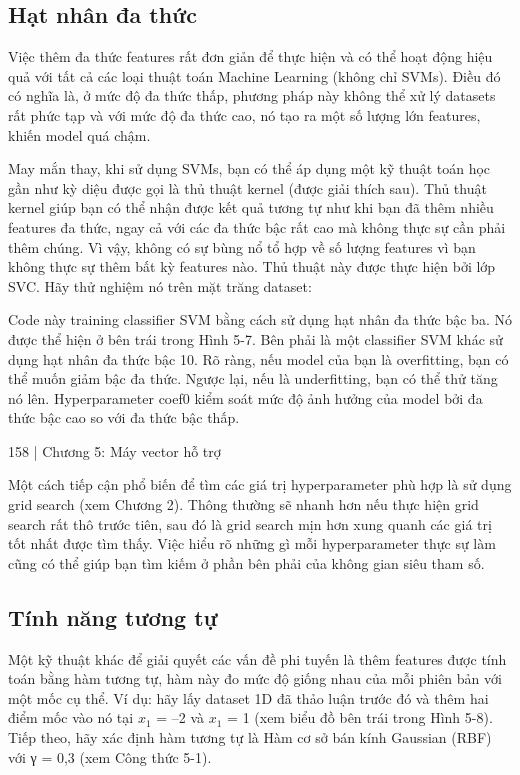 \subsection{Hạt nhân đa thức}

Việc thêm đa thức features rất đơn giản để thực hiện và có thể hoạt động hiệu quả với tất cả các loại thuật toán Machine Learning (không chỉ SVMs). Điều đó có nghĩa là, ở mức độ đa thức thấp, phương pháp này không thể xử lý datasets rất phức tạp và với mức độ đa thức cao, nó tạo ra một số lượng lớn features, khiến model quá chậm.

May mắn thay, khi sử dụng SVMs, bạn có thể áp dụng một kỹ thuật toán học gần như kỳ diệu được gọi là thủ thuật kernel (được giải thích sau). Thủ thuật kernel giúp bạn có thể nhận được kết quả tương tự như khi bạn đã thêm nhiều features đa thức, ngay cả với các đa thức bậc rất cao mà không thực sự cần phải thêm chúng. Vì vậy, không có sự bùng nổ tổ hợp về số lượng features vì bạn không thực sự thêm bất kỳ features nào. Thủ thuật này được thực hiện bởi lớp SVC. Hãy thử nghiệm nó trên mặt trăng dataset:

Code này training classifier SVM bằng cách sử dụng hạt nhân đa thức bậc ba. Nó được thể hiện ở bên trái trong Hình 5-7. Bên phải là một classifier SVM khác sử dụng hạt nhân đa thức bậc 10. Rõ ràng, nếu model của bạn là overfitting, bạn có thể muốn giảm bậc đa thức. Ngược lại, nếu là underfitting, bạn có thể thử tăng nó lên. Hyperparameter coef0 kiểm soát mức độ ảnh hưởng của model bởi đa thức bậc cao so với đa thức bậc thấp.

158 | Chương 5: Máy vector hỗ trợ

Một cách tiếp cận phổ biến để tìm các giá trị hyperparameter phù hợp là sử dụng grid search (xem Chương 2). Thông thường sẽ nhanh hơn nếu thực hiện grid search rất thô trước tiên, sau đó là grid search mịn hơn xung quanh các giá trị tốt nhất được tìm thấy. Việc hiểu rõ những gì mỗi hyperparameter thực sự làm cũng có thể giúp bạn tìm kiếm ở phần bên phải của không gian siêu tham số.

\subsection{Tính năng tương tự}

Một kỹ thuật khác để giải quyết các vấn đề phi tuyến là thêm features được tính toán bằng hàm tương tự, hàm này đo mức độ giống nhau của mỗi phiên bản với một mốc cụ thể. Ví dụ: hãy lấy dataset 1D đã thảo luận trước đó và thêm hai điểm mốc vào nó tại $x_{1}$ = –2 và $x_{1}$ = 1 (xem biểu đồ bên trái trong Hình 5-8). Tiếp theo, hãy xác định hàm tương tự là Hàm cơ sở bán kính Gaussian (RBF) với γ = 0,3 (xem Công thức 5-1).

